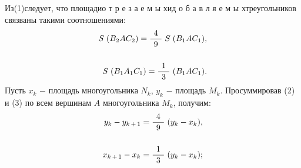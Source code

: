 \begin{minipage}[t]{0.5\linewidth}

Из\hspace{2.5mm}(1)\hspace{2.5mm}следует, что площади\hspace{5mm}о т р е з а е м ы х\hspace{5mm}и\hspace{5mm}д о б а в л я е м ы х\hspace{5mm}треугольников связваны такими соотношениями:
\begin{align}
    S\hspace{1mm}(B_2AC_2) = \frac{\hspace{1.5mm}4\hspace{1.5mm}}{9}\hspace{1mm}S\hspace{1mm}(B_1AC_1), \\
    \nonumber\\
    S\hspace{1mm}(B_1A_1C_1) = \frac{\hspace{1.5mm}1\hspace{1.5mm}}{3}\hspace{1mm}(B_1AC_1).
\end{align}
Пусть $x_k$ \hspace{0.5mm}$-$ \hspace{0.5mm}площадь многоугольника $N_k$, $y_k$ \hspace{0.5mm}$-$ \hspace{0.5mm}площадь \hspace{0.5mm}$M_k$. Просуммировав (2) и (3) по всем вершинам \hspace{0.5mm}$A$ \hspace{0.5mm}многоугольника \hspace{1.5mm}$M_k$, получим:
\begin{align}
    y_k - y_{k\hspace{0.5mm}+\hspace{0.5mm}1} = \frac{\hspace{1.5mm}4\hspace{1.5mm}}{9}\hspace{1mm}(y_k - x_k), \\
    \nonumber\\
    x_{k\hspace{0.5mm}+\hspace{0.5mm}1} - x_k = \frac{\hspace{1.5mm}1\hspace{1.5mm}}{3}\hspace{1mm}(y_k - x_k);

\end{align}
\end{minipage}
